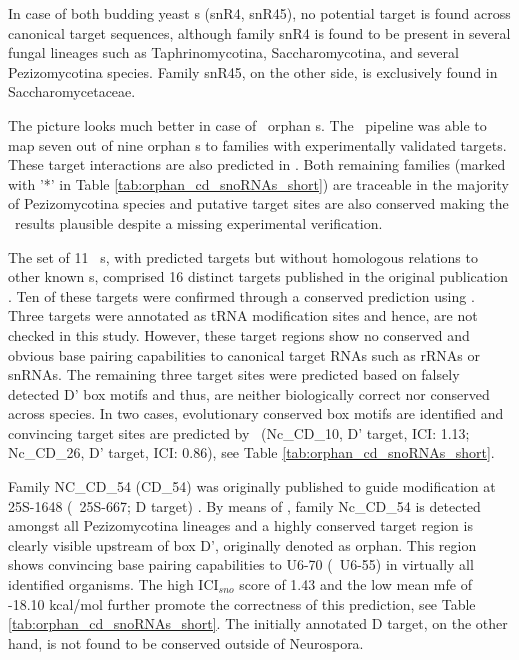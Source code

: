 In case of both budding yeast \sno s (snR4, snR45), no potential
target is found across canonical target sequences, although family
snR4 is found to be present in several fungal lineages such as
Taphrinomycotina, Saccharomycotina, and several Pezizomycotina
species. Family snR45, on the other side, is exclusively found in
Saccharomycetaceae.

The picture looks much better in case of \afu\ orphan \sno s. The
\snostrip\ pipeline was able to map seven out of nine orphan \cd s to
families with experimentally validated targets. These target
interactions are also predicted in \afu. Both remaining families
(marked with '*' in Table \ref{tab:orphan_cd_snoRNAs_short}) are
traceable in the majority of Pezizomycotina species and putative
target sites are also conserved making the \snostrip\ results
plausible despite a missing experimental verification.

The set of 11 \ncr\ \sno s, with predicted targets but without
homologous relations to other known \sno s, comprised 16 distinct
targets published in the original publication \cite{Li:2005}.  Ten of
these targets were confirmed through a conserved prediction using
\snostrip.  Three targets were annotated as tRNA modification sites
and hence, are not checked in this study. However, these target
regions show no conserved and obvious base pairing capabilities to
canonical target RNAs such as rRNAs or snRNAs. The remaining three
target sites were predicted based on falsely detected D' box motifs
and thus, are neither biologically correct nor conserved across
species. In two cases, evolutionary conserved box motifs are
identified and convincing target sites are predicted by \snostrip\
(Nc\_CD\_10, D' target, ICI: 1.13; Nc\_CD\_26, D' target, ICI: 0.86),
see Table \ref{tab:orphan_cd_snoRNAs_short}.

Family NC\_CD\_54 (CD\_54) was originally published to guide
modification at 25S-1648 (\ncr\ 25S-667; D target) \cite{Liu:2009}. By
means of \snostrip, family Nc\_CD\_54 is detected amongst all
Pezizomycotina lineages and a highly conserved target region is
clearly visible upstream of box D', originally denoted as orphan. This
region shows convincing base pairing capabilities to U6-70 (\ncr\
U6-55) in virtually all identified organisms. The high ICI$_{sno}$
score of 1.43 and the low mean mfe of -18.10 kcal/mol further promote
the correctness of this prediction, see Table
\ref{tab:orphan_cd_snoRNAs_short}. The initially
annotated D target, on the other hand, is not found to be conserved outside of Neurospora.\\

